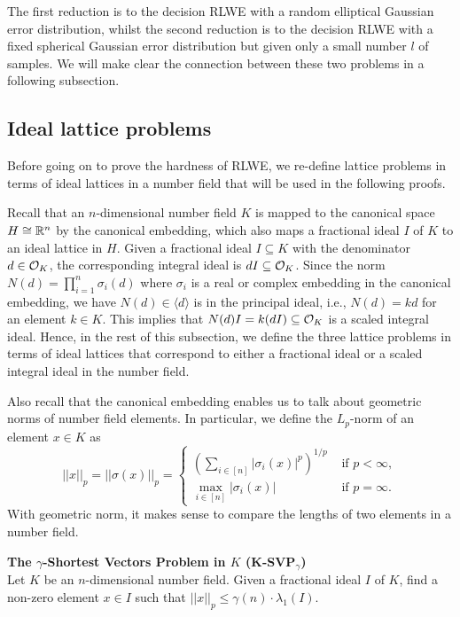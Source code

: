 \documentclass[../main.tex]{subfiles}
\begin{document}
The first reduction is to the decision RLWE with a random elliptical Gaussian error distribution, whilst the second reduction is to the decision RLWE with a fixed spherical Gaussian error distribution but given only a small number $l$ of samples. We will make clear the connection between these two problems in a following subsection. %

\subsection{Ideal lattice problems}

Before going on to prove the hardness of RLWE, we re-define lattice problems in terms of ideal lattices in a number field that will be used  in the following proofs. 

Recall that an $n$-dimensional number field $K$ is mapped to the canonical space $H \cong \mathbb{R}^n$ by the canonical embedding, which also maps a fractional ideal $I$ of $K$ to an ideal lattice in $H$. 
Given a fractional ideal $I \subseteq K$ with the denominator $d \in \mathcal{O}_K$, the corresponding integral ideal is $dI \subseteq \mathcal{O}_K$. Since the norm $N(d)=\prod_{i=1}^n \sigma_i(d)$ where $\sigma_i$ is a real or complex embedding in the canonical embedding, we have $N(d) \in \langle d \rangle$ is in the principal ideal, i.e., $N(d)=k  d$ for an element $k \in K$. This implies that $N(d) I =k(dI) \subseteq  \mathcal{O}_K$ is a scaled integral ideal. 
Hence, in the rest of this subsection, we define the three lattice problems in terms of ideal lattices that correspond to either a fractional ideal or a scaled integral ideal in the number field. 

Also recall that the canonical embedding enables us to talk about geometric norms of number field elements. In particular, we define the $L_p$-norm of an element $x \in K$ as 
\begin{equation*}
    ||x||_p = ||\sigma(x)||_p = 
    \begin{cases}
     \left( \sum_{i \in [n]} |\sigma_i(x)|^p \right)^{1/p} & \text{ if $p < \infty$},  \\
    \max_{i \in [n]} |\sigma_i(x)| & \text{ if $p = \infty$}.
    \end{cases}
\end{equation*}
With geometric norm, it makes sense to compare the lengths of two elements in a number field. 

\begin{tcolorbox}
\noindent
\textbf{The $\gamma$-Shortest Vectors Problem in $K$ (K-SVP$_{\gamma}$)}\\
Let $K$ be an $n$-dimensional number field. Given a fractional ideal $I$ of $K$, find a non-zero element $x \in I$ such that $||x||_p \le \gamma(n) \cdot \lambda_1(I)$.
\end{tcolorbox}
\end{document}
